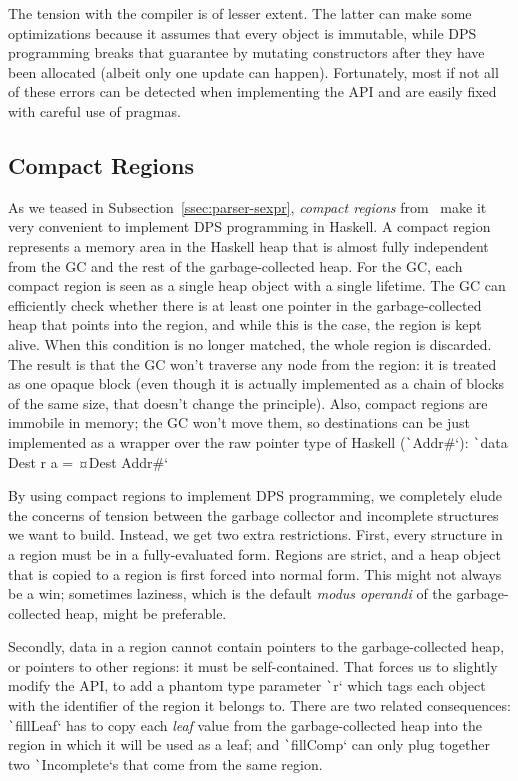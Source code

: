 \documentclass[english]{jflart}
\begin{document}
The tension with the compiler is of lesser extent. The latter can make some optimizations because it assumes that every object is immutable, while DPS programming breaks that guarantee by mutating constructors after they have been allocated (albeit only one update can happen). Fortunately, most if not all of these errors can be detected when implementing the API and are easily fixed with careful use of pragmas.

\subsection{Compact Regions}\label{ssec:impl-compact-regions}

As we teased in Subsection~\ref{ssec:parser-sexpr}, \emph{compact regions} from~\cite{yang_efficient_2015} make it very convenient to implement DPS programming in 
Haskell. A compact region represents a memory area in the Haskell heap that is almost fully independent from the GC and the rest of the garbage-collected heap. For the GC, each compact region is seen as a single heap object with a single lifetime. The GC can efficiently check whether there is at least one pointer in the garbage-collected heap that points into the region, and while this is the case, the region is kept alive. When this condition is no longer matched, the whole region is discarded. The result is that the GC won't traverse any node from the region: it is treated as one opaque block (even though it is actually implemented as a chain of blocks of the same size, that doesn't change the principle). Also, compact regions are immobile in memory; the GC won't move them, so destinations can be just implemented as a wrapper over the raw pointer type of Haskell (\texttt`Addr#`): \texttt`data Dest r a = ¤Dest Addr#`

By using compact regions to implement DPS programming, we completely elude the concerns of tension between the garbage collector and incomplete structures we want to build. Instead, we get two extra restrictions. First, every structure in a region must be in a fully-evaluated form. Regions are strict, and a heap object that is copied to a region is first forced into normal form. This might not always be a win; sometimes laziness, which is the default \emph{modus operandi} of the garbage-collected heap, might be preferable.

Secondly, data in a region cannot contain pointers to the garbage-collected heap, or pointers to other regions: it must be self-contained. That forces us to slightly modify the API, to add a phantom type parameter \texttt`r` which tags each object with the identifier of the region it belongs to. There are two related consequences: \texttt`fillLeaf` has to copy each \emph{leaf} value from the garbage-collected heap into the region in which it will be used as a leaf; and \texttt`fillComp` can only plug together two \texttt`Incomplete`s that come from the same region.
\end{document}
